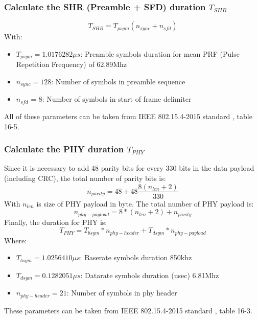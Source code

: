 \documentclass[\main/thesis.tex]{subfiles}
\begin{document}
\subsubsection{Calculate the SHR (Preamble + SFD) duration $T_{SHR}$}
\begin{equation}
    T_{SHR} = T_{psym}(n_{sync} + n_{sfd})
\end{equation}
With:
\begin{itemize}
    \item $T_{psym} = 1.0176282 \mu s$: Preamble symbols duration for mean PRF (Pulse Repetition Frequency) of 62.89Mhz
    \item $n_{sync} = 128 $: Number of symbols in preamble sequence
    \item $n_{sfd}$ = 8: Number of symbols in start of frame delimiter
\end{itemize}
All of these parameters can be taken from IEEE 802.15.4-2015 standard \cite{IEEE_Std_802_15_4_2015}, table 16-5.

\subsubsection{Calculate the PHY duration $T_{PHY}$}
Since it is necessary to add 48 parity bits for every 330 bits in the data payload (including CRC), the total number of parity bits is:
\begin{equation}
    n_{parity} = 48 + 48\frac{8(n_{len}+2)}{330}
\end{equation}
With $n_{len}$ is size of PHY payload in byte.
The total number of PHY payload is:
\begin{equation}
    n_{phy-payload} = 8*(n_{len}+2) + n_{parity}
\end{equation}
Finally, the duration for PHY is:
\begin{equation}
    T_{PHY} = T_{bsym} * n_{phy-header} + T_{dsym} * n_{phy-payload}
\end{equation}
Where:
\begin{itemize}
    \item $T_{bsym} = 1.0256410 \mu s$: Baserate symbols duration 850khz
    \item $T_{dsym} = 0.1282051 \mu s$: Datarate symbols duration (usec) 6.81Mhz
    \item $n_{phy-header} = 21$: Number of symbols in phy header
\end{itemize}
These parameters can be taken from IEEE 802.15.4-2015 standard \cite{IEEE_Std_802_15_4_2015}, table 16-3.
\end{document}
